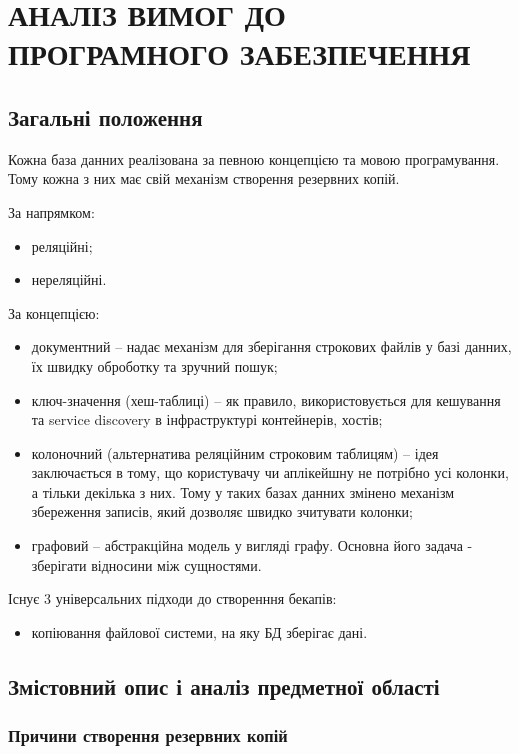 \chapter{АНАЛІЗ ВИМОГ ДО ПРОГРАМНОГО ЗАБЕЗПЕЧЕННЯ}

\section{Загальні положення}
Кожна база данних реалізована за певною концепцією та мовою програмування.
Тому кожна з них має свій механізм створення резервних копій.

За напрямком:
\begin{itemize}
    \item реляційні;
    \item нереляційні.
\end{itemize}

За концепцією:
\begin{itemize}
    \item документний -- надає механізм для зберігання строкових файлів у базі данних, їх швидку оброботку та зручний пошук;
    \item ключ-значення (хеш-таблиці) -- як правило, використовується для кешування та service 
    discovery в інфраструктурі контейнерів, хостів;
    \item колоночний (альтернатива реляційним строковим таблицям) -- ідея заключається в тому,
    що користувачу чи аплікейшну не потрібно усі колонки, а тільки декілька з них.
    Тому у таких базах данних змінено механізм збереження записів,
    який дозволяє швидко зчитувати колонки;
    \item графовий -- абстракційна модель у вигляді графу. 
    Основна його задача - зберігати відносини між сущностями.
\end{itemize}

Існує 3 універсальних підходи до створенння бекапів:
\begin{itemize}
    \item копіювання файлової системи, на яку БД зберігає дані.
\end{itemize}

\section{Змістовний опис і аналіз предметної області}

\subsection{Причини створення резервних копій}


